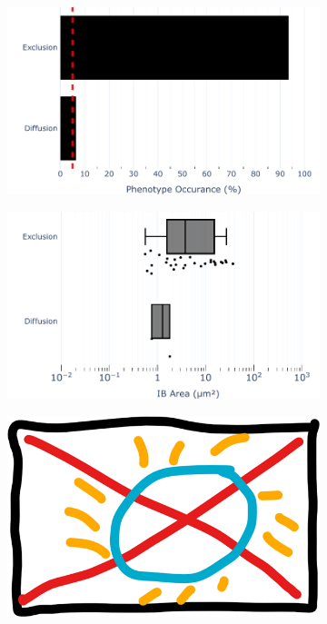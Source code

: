 \begin{figure}
    \begin{subfigure}{0.5\textwidth}
        \caption{}
        \includegraphics[width=1\linewidth]{10. Chapter 5/Figs/03. IFIT2-FLAG/03. IFIT2F/02. Infection Transfection/07. bar_bi2f_brsv.pdf} 
    \end{subfigure}
    \begin{subfigure}{0.5\textwidth}
        \caption{}
        \includegraphics[width=1\linewidth]{10. Chapter 5/Figs/03. IFIT2-FLAG/03. IFIT2F/02. Infection Transfection/08. box_bi2f_brsv.pdf}
    \end{subfigure}
    \begin{subfigure}{1\textwidth}
        \centering
        \caption{}
        \includegraphics[width=1\linewidth]{10. Chapter 5/Figs/00. placeholder.png}

\end{subfigure}
\end{figure}
